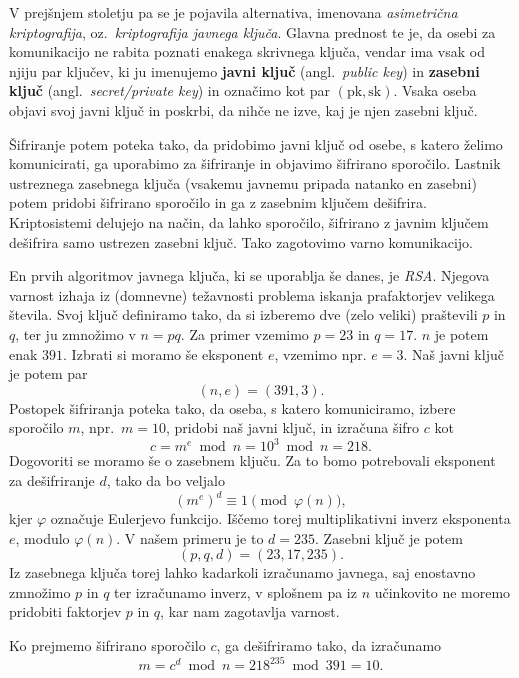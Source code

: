\documentclass[isrm2, tisk]{fmfdelo}
\begin{document}
V prejšnjem stoletju pa se je pojavila alternativa, imenovana \textit{asimetrična kriptografija}, oz.\
\textit{kriptografija javnega ključa}. Glavna prednost te je, da osebi za komunikacijo ne rabita
poznati enakega skrivnega ključa, vendar ima vsak od njiju par ključev, ki ju imenujemo \textbf{javni
ključ} (angl.\ \textit{public key}) in \textbf{zasebni ključ} (angl.\ \textit{secret/private key}) in
označimo kot par $(\text{pk}, \text{sk})$. Vsaka oseba objavi svoj javni ključ in poskrbi, da nihče 
ne izve, kaj je njen zasebni ključ.

Šifriranje potem poteka tako, da pridobimo javni ključ od osebe, s katero želimo komunicirati, ga
uporabimo za šifriranje in objavimo šifrirano sporočilo. Lastnik ustreznega zasebnega ključa (vsakemu
javnemu pripada natanko en zasebni) potem pridobi šifrirano sporočilo in ga z zasebnim ključem
dešifrira. Kriptosistemi delujejo na način, da lahko sporočilo, šifrirano z javnim ključem dešifrira
samo ustrezen zasebni ključ. Tako zagotovimo varno komunikacijo.

\begin{primer}[RSA]
\label{primer:rsa}
    En prvih algoritmov javnega ključa, ki se uporablja še danes, je \textit{RSA}. Njegova varnost izhaja 
    iz (domnevne) težavnosti problema iskanja prafaktorjev velikega števila. Svoj ključ definiramo tako, 
    da si izberemo dve (zelo veliki) praštevili $p$ in $q$, ter ju zmnožimo v $n = pq$. Za primer vzemimo 
    $p = 23$ in  $q = 17$. $n$ je potem enak $391$. Izbrati si moramo še eksponent $e$, vzemimo npr. $e = 3$. 
    Naš javni ključ je potem par 
    $$ 
    (n, e) = (391, 3).
    $$
    Postopek šifriranja poteka tako, da oseba, s katero komuniciramo, izbere sporočilo $m$, npr.\ 
    $m = 10$, pridobi naš javni ključ, in izračuna šifro $c$ kot
    $$
    c = m^e \bmod{n} = 10^3 \bmod{n} = 218.
    $$
    Dogovoriti se moramo še o zasebnem ključu. Za to bomo potrebovali eksponent za dešifriranje $d$,
    tako da bo veljalo 
    $$
    (m^e)^d \equiv 1 \pmod{\varphi(n)},
    $$ 
    kjer $\varphi$ označuje Eulerjevo funkcijo. Iščemo torej multiplikativni inverz eksponenta 
    $e$, modulo $\varphi(n)$. V našem primeru je to $d = 235$. Zasebni ključ je potem 
    $$ 
    (p, q, d) = (23, 17, 235). 
    $$
    Iz zasebnega ključa torej lahko kadarkoli izračunamo javnega, saj enostavno zmnožimo $p$ in $q$ 
    ter izračunamo inverz, v splošnem pa iz $n$ učinkovito ne moremo pridobiti faktorjev $p$ in $q$,
    kar nam zagotavlja varnost.

    Ko prejmemo šifrirano sporočilo $c$, ga dešifriramo tako, da izračunamo
    $$
    m = c^d \bmod{n} = 218^{235} \bmod{391} = 10.
    $$
\end{primer}
\end{document}

